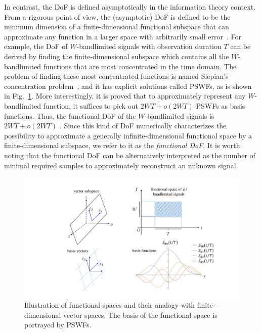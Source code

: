 \documentclass[journal,twocolumn]{IEEEtran}
\begin{document}
In contrast, the DoF is defined asymptotically in the information theory context. From a rigorous point of view, the (asymptotic) DoF is defined to be the minimum dimension of a finite-dimensional functional subspace that can approximate any function in a larger space with arbitrarily small error~\cite{poon2005degrees}. For example, the DoF of $W$-bandlimited signals with observation duration $T$ can be derived by finding the finite-dimensional subspace which contains all the $W$-bandlimited functions that are most concentrated in the time domain. The problem of finding these most concentrated functions is named Slepian's concentration problem~\cite{slepian1976bandwidth}, and it has explicit solutions called PSWFs, as is shown in Fig.~\ref{fig:PSWF}.
More interestingly, it is proved that to approximately represent any $W$-bandlimited function, it suffices to pick out $2WT+o(2WT)$ PSWFs as basis functions. Thus, the functional DoF of the $W$-bandlimited signals is $2WT+o(2WT)$ \cite{slepian1976bandwidth}. 
Since this kind of DoF numerically characterizes the possibility to approximate a generally infinite-dimensional functional space by a finite-dimensional subspace, we refer to it as the {{\emph{functional DoF}}}. 
It is worth noting that the functional DoF can be alternatively interpreted as the number of minimal required samples to approximately reconstruct an unknown signal. 
\begin{figure}
	\centering 
	\includegraphics[width=\linewidth]{figures/PSWF.pdf} 
	\caption{Illustration of functional spaces and their analogy with finite-dimensional vector spaces. The basis of the functional space is portrayed by PSWFs. }
	\label{fig:PSWF}
\end{figure}
\end{document}
